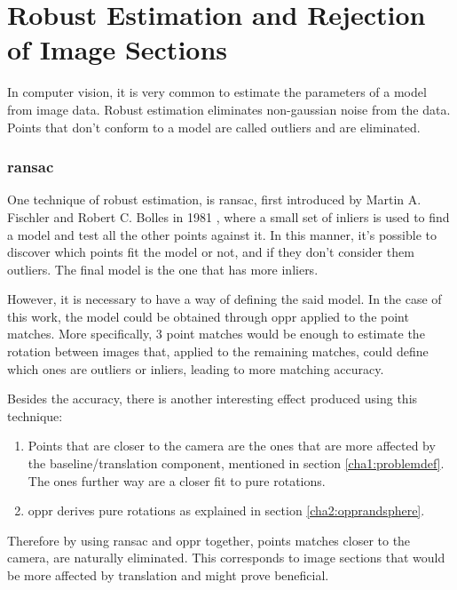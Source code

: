 
\section{Robust Estimation and Rejection of Image Sections}
\label{cha2:robustest}

In computer vision, it is very common to estimate the parameters of a model from image data. Robust estimation eliminates non-gaussian noise from the data. Points that don’t conform to a model are called outliers and are eliminated.

\subsubsection{\acrlong{ransac}}

One technique of robust estimation, is \acrfull{ransac}, first introduced by Martin A. Fischler and Robert C. Bolles in 1981 \cite{ransac}, where a small set of inliers is used to find a model and test all the 
other points against it. In this manner, it's possible to discover which points fit the model or not, and if they don’t consider them outliers. The final model is the one that has more inliers. 

However, it is necessary to have a way of defining the said model. In the case of this work, the model could be obtained through \acrlong{oppr} applied to the point matches. More specifically, 3 point matches would be enough to estimate the rotation between images that, applied to the remaining matches, could define which ones are outliers or inliers, leading to more matching accuracy.

Besides the accuracy, there is another interesting effect produced using this technique:

\begin{enumerate}
\item Points that are closer to the camera are the ones that are more affected by the baseline/translation component, mentioned in section \ref{cha1:problemdef}. The ones further way are a closer fit to pure rotations.

\item \acrshort{oppr} derives pure rotations as explained in section \ref{cha2:opprandsphere}. 
\end{enumerate}
Therefore by using \acrshort{ransac} and \acrshort{oppr} together, points matches closer to the camera, are naturally eliminated. This corresponds to image sections that would be more affected by translation and might prove beneficial. \cite{mono} 

